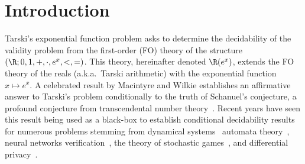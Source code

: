 \section{Introduction}
\label{sec:introduction}

Tarski's exponential function problem asks to determine the decidability of the
validity problem from the first-order (FO) theory of the structure $(\R; 0, 1,
+, \cdot, e^x, <, =)$. This theory, hereinafter denoted $\R(e^x)$, extends the
FO theory of the reals (a.k.a.~Tarski arithmetic) with the exponential
function~${x \mapsto e^x}$. A celebrated result by Macintyre and Wilkie
establishes an affirmative answer to Tarski's problem
conditionally to the truth of Schanuel's conjecture, a profound conjecture from
transcendental number theory~\cite{MacWilkie96}. Recent years have seen this
result being used as a black-box to establish conditional decidability results
for numerous problems stemming from dynamical systems~\cite{Dantam21,Almagor22}
automata theory~\cite{Daviaud21,ChistikovKMP22}, neural networks
verification~\cite{HankalaHKV24,IsacZBK23}, the theory of stochastic
games~\cite{BaierCMP23}, and differential privacy~\cite{BartheCKS021}. 

